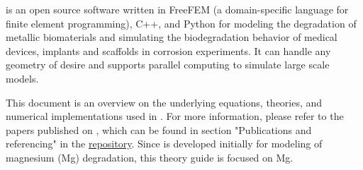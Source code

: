 \biodeg{} is an open source software written in FreeFEM (a domain-specific language for finite element programming), C++, and Python for modeling the degradation of metallic biomaterials and simulating the biodegradation behavior of medical devices, implants and scaffolds in corrosion experiments. It can handle any geometry of desire and supports parallel computing to simulate large scale models.

This document is an overview on the underlying equations, theories, and numerical implementations used in \biodeg{}. For more information, please refer to the papers published on \biodeg{}, which can be found in  section "Publications and referencing" in the \href{https://github.com/mbarzegary/BioDeg}{\biodeg{} repository}. Since \biodeg{} is developed initially for modeling of magnesium (Mg) degradation, this theory guide is focused on  Mg. 
